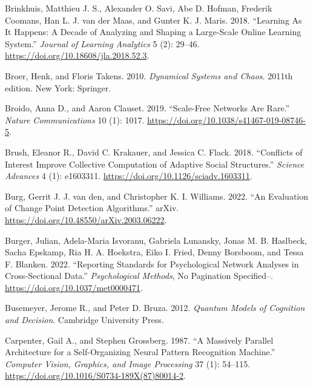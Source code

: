 \documentclass[
  a4paper,
  DIV=11,
  numbers=noendperiod,
  oneside]{scrreprt}
\newlength{\cslhangindent}
\newenvironment{CSLReferences}[2] %
 {\begin{list}{}{%
  \setlength{\itemindent}{0pt}
  \setlength{\leftmargin}{0pt}
  \setlength{\parsep}{0pt}
  \ifodd #1
   \setlength{\leftmargin}{\cslhangindent}
   \setlength{\itemindent}{-1\cslhangindent}
  \fi
  \setlength{\itemsep}{#2\baselineskip}}}
 {\end{list}}
\begin{document}
\begin{CSLReferences}{1}{0}
Brinkhuis, Matthieu J. S., Alexander O. Savi, Abe D. Hofman, Frederik
Coomans, Han L. J. van der Maas, and Gunter K. J. Maris. 2018.
{``Learning {As It Happens}: {A Decade} of {Analyzing} and {Shaping} a
{Large-Scale Online Learning System}.''} \emph{Journal of Learning
Analytics} 5 (2): 29--46. \url{https://doi.org/10.18608/jla.2018.52.3}.

Broer, Henk, and Floris Takens. 2010. \emph{Dynamical Systems and
Chaos}. 2011th edition. New York: Springer.

Broido, Anna D., and Aaron Clauset. 2019. {``Scale-Free Networks Are
Rare.''} \emph{Nature Communications} 10 (1): 1017.
\url{https://doi.org/10.1038/s41467-019-08746-5}.

Brush, Eleanor R., David C. Krakauer, and Jessica C. Flack. 2018.
{``Conflicts of Interest Improve Collective Computation of Adaptive
Social Structures.''} \emph{Science Advances} 4 (1): e1603311.
\url{https://doi.org/10.1126/sciadv.1603311}.

Burg, Gerrit J. J. van den, and Christopher K. I. Williams. 2022. {``An
{Evaluation} of {Change Point Detection Algorithms}.''} {arXiv}.
\url{https://doi.org/10.48550/arXiv.2003.06222}.

Burger, Julian, Adela-Maria Isvoranu, Gabriela Lunansky, Jonas M. B.
Haslbeck, Sacha Epskamp, Ria H. A. Hoekstra, Eiko I. Fried, Denny
Borsboom, and Tessa F. Blanken. 2022. {``Reporting Standards for
Psychological Network Analyses in Cross-Sectional Data.''}
\emph{Psychological Methods}, No Pagination Specified--.
\url{https://doi.org/10.1037/met0000471}.

Busemeyer, Jerome R., and Peter D. Bruza. 2012. \emph{Quantum {Models}
of {Cognition} and {Decision}}. {Cambridge University Press}.

Carpenter, Gail A., and Stephen Grossberg. 1987. {``A Massively Parallel
Architecture for a Self-Organizing Neural Pattern Recognition
Machine.''} \emph{Computer Vision, Graphics, and Image Processing} 37
(1): 54--115. \url{https://doi.org/10.1016/S0734-189X(87)80014-2}.


\end{CSLReferences}
\end{document}
